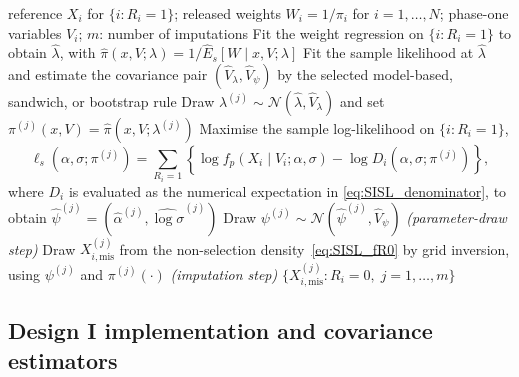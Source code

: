 \begin{algorithm}[t]
\caption{Sample imputation via sample likelihood (SISL)}
\label{alg:sisl}
\begin{algorithmic}[1]
    \Require reference $X_i$ for $\{i : R_i = 1\}$;
             released weights $W_i = 1/\pi_i$ for $i = 1,\ldots,N$;
             phase-one variables $V_i$;
             $m$: number of imputations
    \State Fit the weight regression on $\{i:R_i=1\}$ to obtain $\hat\lambda$, with
           $\hat\pi(x,V;\lambda)=1/\hat E_s[W\mid x,V;\lambda]$
    \State Fit the sample likelihood at $\hat\lambda$ and estimate the covariance pair
           $(\hat V_\lambda,\hat V_\psi)$ by the selected model-based, sandwich,
           or bootstrap rule
        \State Draw $\lambda^{(j)}\sim\mathcal N(\hat\lambda,\hat V_\lambda)$ and
               set $\pi^{(j)}(x,V)=\hat\pi(x,V;\lambda^{(j)})$
        \State Maximise the sample log-likelihood on $\{i:R_i=1\}$,
               \[
               \ell_s(\alpha,\sigma;\pi^{(j)})
               =\sum_{R_i=1}\left\{
               \log f_p(X_i\mid V_i;\alpha,\sigma)
               -\log D_i(\alpha,\sigma;\pi^{(j)})
               \right\},
               \]
               where $D_i$ is evaluated as the numerical expectation in
               \eqref{eq:SISL_denominator}, to obtain
               $\hat\psi^{(j)}=(\hat\alpha^{(j)},\widehat{\log\sigma}^{(j)})$
        \State Draw $\psi^{(j)}\sim\mathcal N(\hat\psi^{(j)},\hat V_\psi)$
               \hfill\textit{(parameter-draw step)}
            \State Draw $X_{i,\mathrm{mis}}^{(j)}$ from the non-selection density~\eqref{eq:SISL_fR0}
                   by grid inversion, using $\psi^{(j)}$ and $\pi^{(j)}(\cdot)$
                   \hfill\textit{(imputation step)}
        \EndFor
    \EndFor
    \State \Return $\{X_{i,\mathrm{mis}}^{(j)} : R_i = 0,\; j = 1,\ldots,m\}$
\end{algorithmic}
\end{algorithm}
 
 
\subsection{Design I implementation and covariance estimators}
\label{sec:SISL_method_implementation}
 
